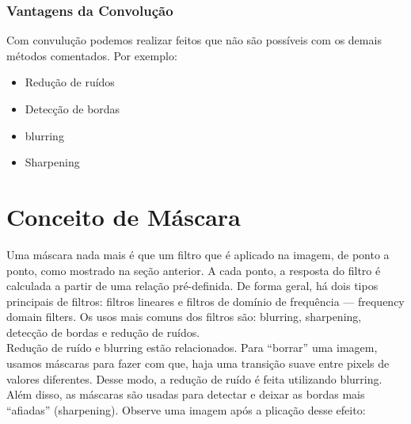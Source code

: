 \documentclass[a4paper, 12pt]{article}
\begin{document}
\subsubsection{Vantagens da Convolução}
Com convulução podemos realizar feitos que não são possíveis com os demais métodos comentados. Por exemplo:
\begin{itemize}
	\item Redução de ruídos
 	\item Detecção de bordas
 	\item blurring
 	\item Sharpening
\end{itemize}

\section{Conceito de Máscara}
Uma máscara nada mais é que um filtro que é aplicado na imagem, de ponto a ponto, como mostrado na seção anterior. A cada ponto, a resposta do filtro 
é calculada a partir de uma relação pré-definida. De forma geral, há dois tipos principais de filtros: filtros lineares e filtros de domínio de frequência 
--- frequency domain filters. Os usos mais comuns dos filtros são: blurring, sharpening, detecção de bordas e redução de ruídos.
\\

Redução de ruído e blurring estão relacionados. Para ``borrar'' uma imagem, usamos máscaras para fazer com que, haja uma transição suave entre pixels de 
valores diferentes. Desse modo, a redução de ruído é feita utilizando blurring. Além disso, as máscaras são usadas para detectar e deixar as bordas mais 
``afiadas'' (sharpening). Observe uma imagem após a plicação desse efeito:
\end{document}
